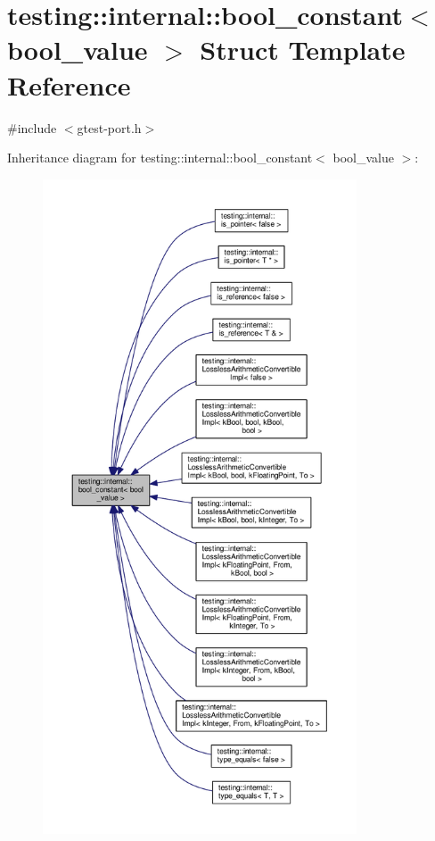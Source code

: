 \hypertarget{structtesting_1_1internal_1_1bool__constant}{}\section{testing\+:\+:internal\+:\+:bool\+\_\+constant$<$ bool\+\_\+value $>$ Struct Template Reference}
\label{structtesting_1_1internal_1_1bool__constant}


{\ttfamily \#include $<$gtest-\/port.\+h$>$}



Inheritance diagram for testing\+:\+:internal\+:\+:bool\+\_\+constant$<$ bool\+\_\+value $>$\+:\nopagebreak
\begin{figure}[H]
\begin{center}
\leavevmode
\includegraphics[height=550pt]{structtesting_1_1internal_1_1bool__constant__inherit__graph}
\end{center}
\end{figure}
